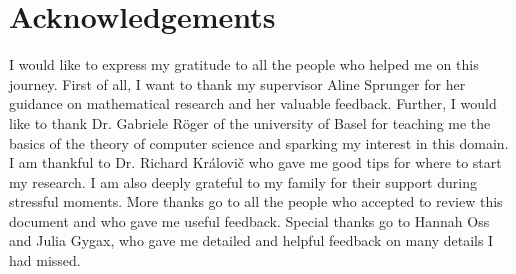 \chapter*{Acknowledgements}

I would like to express my gratitude to all the people who helped me on this journey.
First of all, I want to thank my supervisor Aline Sprunger for her guidance on mathematical research and her valuable feedback.
Further, I would like to thank Dr. Gabriele Röger of the university of Basel for teaching me the basics of the theory of computer science and sparking my interest in this domain.
I am thankful to Dr. Richard Královi\v{c} who gave me good tips for where to start my research.
I am also deeply grateful to my family for their support during stressful moments.
More thanks go to all the people who accepted to review this document and who gave me useful feedback.
Special thanks go to Hannah Oss and Julia Gygax, who gave me detailed and helpful feedback on many details I had missed.

